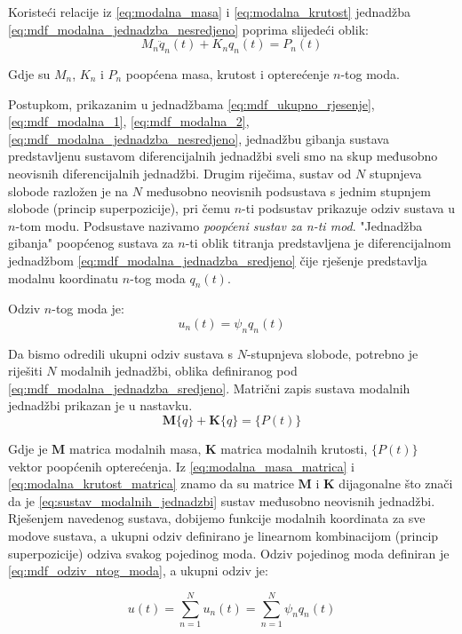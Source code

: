 \documentclass{rgn}
\newcommand\K{\mathbf{K}}
\newcommand\M{\mathbf{M}}
\begin{document}
Koristeći relacije iz \eqref{eq:modalna_masa} i \eqref{eq:modalna_krutost} jednadžba
\eqref{eq:mdf_modalna_jednadzba_nesredjeno} poprima slijedeći oblik:
\begin{equation}\label{eq:mdf_modalna_jednadzba_sredjeno}
    M_n\ddot{q}_n(t)+K_nq_n(t)=P_n(t)
\end{equation}

Gdje su $M_n$, $K_n$ i $P_n$ poopćena masa, krutost i opterećenje $n$-tog moda.

Postupkom, prikazanim u jednadžbama \eqref{eq:mdf_ukupno_rjesenje},
\eqref{eq:mdf_modalna_1}, \eqref{eq:mdf_modalna_2},
\eqref{eq:mdf_modalna_jednadzba_nesredjeno}, jednadžbu gibanja sustava predstavljenu
sustavom diferencijalnih jednadžbi sveli smo na skup međusobno neovisnih
diferencijalnih jednadžbi. Drugim riječima, sustav od $N$ stupnjeva slobode razložen
je na $N$ međusobno neovisnih podsustava s jednim stupnjem slobode (princip superpozicije), 
pri čemu $n$-ti podsustav prikazuje odziv sustava u $n$-tom modu. Podsustave 
nazivamo \textit{poopćeni sustav za n-ti mod}. "Jednadžba gibanja" 
poopćenog sustava za $n$-ti oblik titranja predstavljena je diferencijalnom jednadžbom
\eqref{eq:mdf_modalna_jednadzba_sredjeno} čije rješenje predstavlja modalnu 
koordinatu $n$-tog moda $q_n(t)$.
\par

Odziv $n$-tog moda je:
\begin{equation}\label{eq:mdf_odziv_ntog_moda}
    u_n(t)=\psi_nq_n(t)
\end{equation}

Da bismo odredili ukupni odziv sustava s $N$-stupnjeva slobode, potrebno je riješiti
$N$ modalnih jednadžbi, oblika definiranog pod \eqref{eq:mdf_modalna_jednadzba_sredjeno}.
Matrični zapis sustava modalnih jednadžbi prikazan je u nastavku.
\begin{equation}\label{eq:sustav_modalnih_jednadzbi}
    \M\{q\} + \K\{q\}=\{P(t)\}
\end{equation}

Gdje je $\M$ matrica modalnih masa, $\K$ matrica modalnih krutosti, $\{P(t)\}$
vektor poopćenih opterećenja. Iz \eqref{eq:modalna_masa_matrica} i
\eqref{eq:modalna_krutost_matrica} znamo da su matrice $\M$ i $\K$ dijagonalne što
znači da je \eqref{eq:sustav_modalnih_jednadzbi} sustav međusobno neovisnih jednadžbi.
Rješenjem navedenog sustava, dobijemo funkcije modalnih koordinata za sve modove
sustava, a ukupni odziv definirano je linearnom kombinacijom (princip superpozicije) 
odziva svakog pojedinog moda. Odziv pojedinog moda definiran je
\eqref{eq:mdf_odziv_ntog_moda}, a ukupni odziv je:

\begin{equation}\label{eq:mdf_modalna_ukupno_rjesenje}
    u(t)=\sum_{n=1}^Nu_n(t)=\sum_{n=1}^N\psi_nq_n(t)
\end{equation}
\end{document}
